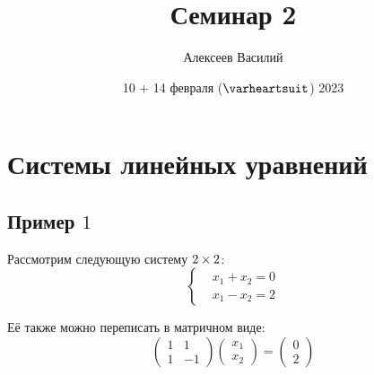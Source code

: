 \documentclass[a4paper,12pt]{article}
\author{Алексеев Василий}
\title{Семинар 2}
\date{10 + 14 февраля ($\heart$) 2023}
\begin{document}
  \maketitle
  
  \tableofcontents

  \thispagestyle{empty}
  
  \newpage
  


  \section{Системы линейных уравнений}

  \subsection{Пример $1$}

  Рассмотрим следующую систему $2 \hm\times 2$:
  \begin{equation}\label{eq:example-1-single-solution}
    \left\{ \begin{aligned}
      &x_1 + x_2 = 0\\
      &x_1 - x_2 = 2
    \end{aligned} \right.
  \end{equation}

  Её также можно переписать в матричном виде:
  \[
    \begin{pmatrix}
      1 & 1\\
      1 & -1
    \end{pmatrix} \begin{pmatrix}
      x_1 \\ x_2
    \end{pmatrix} = \begin{pmatrix}
      0 \\ 2
    \end{pmatrix}
  \]
\end{document}
